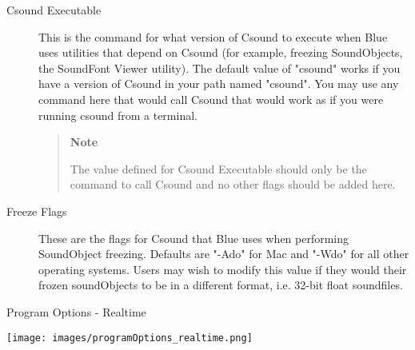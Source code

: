 \begin{description}
\item[Csound Executable]
This is the command for what version of Csound to execute when Blue uses
utilities that depend on Csound (for example, freezing SoundObjects, the
SoundFont Viewer utility). The default value of "csound" works if you
have a version of Csound in your path named "csound". You may use any
command here that would call Csound that would work as if you were
running csound from a terminal.

\begin{quote}
\textbf{Note}

The value defined for Csound Executable should only be the command to
call Csound and no other flags should be added here.
\end{quote}
\item[Freeze Flags]
These are the flags for Csound that Blue uses when performing
SoundObject freezing. Defaults are "-Ado" for Mac and "-Wdo" for all
other operating systems. Users may wish to modify this value if they
would their frozen soundObjects to be in a different format, i.e. 32-bit
float soundfiles.
\end{description}

Program Options - Realtime

\texttt{[image: images/programOptions\_realtime.png]}


